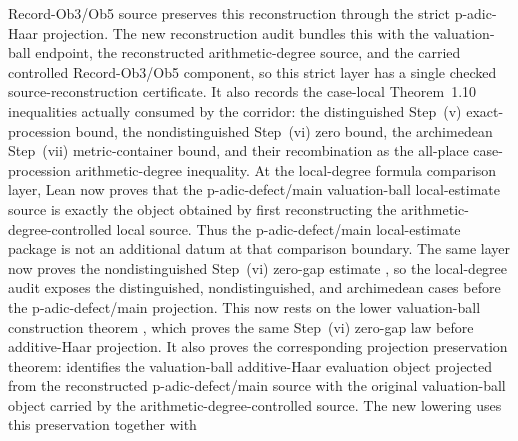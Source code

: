 \documentclass[11pt]{article}
\theoremstyle{plain}
\theoremstyle{definition}
\theoremstyle{remark}
\begin{document}
Record-Ob3/Ob5 source preserves this reconstruction through the strict
p-adic-Haar projection.  The new reconstruction audit bundles this with the
valuation-ball endpoint, the reconstructed arithmetic-degree source, and the
carried controlled Record-Ob3/Ob5 component, so this strict layer has a single
checked source-reconstruction certificate.  It also records the case-local
Theorem~1.10 inequalities actually consumed by the corridor: the distinguished
Step~(v) exact-procession bound, the nondistinguished Step~(vi) zero bound,
the archimedean Step~(vii) metric-container bound, and their recombination as
the all-place case-procession arithmetic-degree inequality.
At the local-degree formula comparison layer, Lean now proves that the
p-adic-defect/main valuation-ball local-estimate source is exactly the object
obtained by first reconstructing the arithmetic-degree-controlled local source.
Thus the p-adic-defect/main local-estimate package is not an additional datum at
that comparison boundary.  The same layer now proves the nondistinguished
Step~(vi) zero-gap estimate
\texttt{},
so the local-degree audit exposes the distinguished, nondistinguished, and
archimedean cases before the p-adic-defect/main projection.  This now rests on
the lower valuation-ball construction theorem
\texttt{},
which proves the same Step~(vi) zero-gap law before additive-Haar projection.
It also proves the corresponding projection preservation theorem:
\texttt{}
identifies the valuation-ball additive-Haar evaluation object projected from the
reconstructed p-adic-defect/main source with the original valuation-ball object
carried by the arithmetic-degree-controlled source.  The new lowering
\texttt{}
uses this preservation together with
\end{document}
